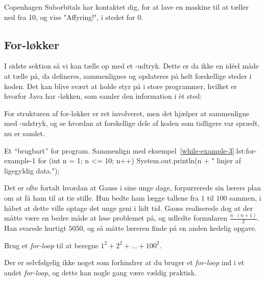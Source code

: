 		\begin{exercise}
			Copenhagen Suborbitals har kontaktet dig, for at lave en maskine til
			at tæller ned fra 10, og vise "Affyring!", i stedet for 0.
		\end{exercise}

	\subsection{For-løkker}

		I sidste sektion så vi kan tælle op med et -udtryk.
		Dette er da ikke en idéel måde at tælle på, da 
		defineres, sammenlignes og opdateres på helt forskellige steder i koden.
		Det kan blive svært at holde styr på i store programmer, hvilket er
		hvorfor Java har -løkken, som samler den information i
		èt sted: 



		For strukturen af for-løkker er ret involveret, men det hjælper at
		sammenligne med -udstryk, og se hvordan at forskellige
		dele af koden som tidligere var sprædt, nu er samlet.

		\begin{JavaCode}{Et ``brugbart'' for program. Sammenlign med eksempel~\ref{while-example-3}.}{lst:for-example-1}
			for (int n = 1; n <= 10; n++) {
				System.out.println(n + " linjer af ligegyldig data.");
			}
		\end{JavaCode}

		\begin{exercise}
			Det er ofte fortalt hvordan at Gauss i sine unge dage, forpurrerede sin
			lærers plan om at få ham til at tie stille. Hun bedte ham lægge tallene
			fra \(1\) til \(100\) sammen, i håbet at dette ville optage det unge
			geni i lidt tid. Gauss realiserede dog at der måtte være en bedre måde
			at løse problemet på, og udledte formularen \(\frac{n\cdot(n+1)}{2}\).
			Han svarede hurtigt \(5050\), og så måtte læreren finde på en anden
			kedelig opgave.

			Brug et \emph{for-loop} til at beregne \(1^2+2^2+\dots+100^2\).
		\end{exercise}

		\begin{exercise}
			Der er selvfølgelig ikke noget som forhindrer at du bruger et
			\emph{for-loop} ind i et andet \emph{for-loop}, og dette kan nogle gang
			være vældig praktisk.

		\end{exercise}

